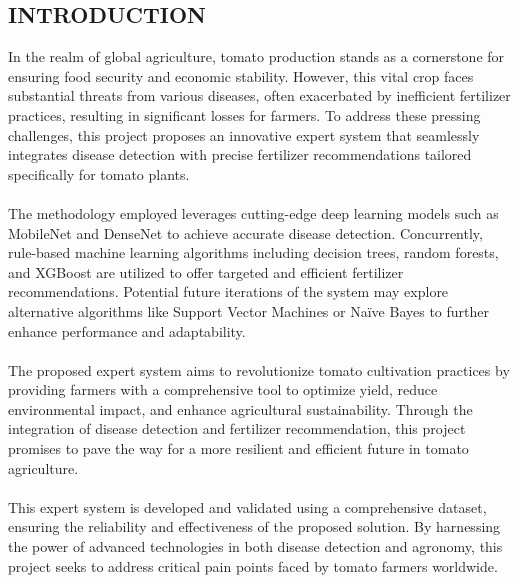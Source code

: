 \documentclass[12pt, English]{article}
\newcommand\tab[1][1cm]{\hspace*{#1}}
\begin{document}
\pagestyle{fancy}
\fancyfoot[R]{\footnotesize\thepage}
\begin{center}
\section{\Large INTRODUCTION}
\end{center}
\begin{normalsize}

\tab In the realm of global agriculture, tomato production stands as a cornerstone for ensuring food security and economic stability. However, this vital crop faces substantial threats from various diseases, often exacerbated by inefficient fertilizer practices, resulting in significant losses for farmers. To address these pressing challenges, this project proposes an innovative expert system that seamlessly integrates disease detection with precise fertilizer recommendations tailored specifically for tomato plants. 
\\\\
\tab  
The methodology employed leverages cutting-edge deep learning models such as MobileNet and DenseNet to achieve accurate disease detection. Concurrently, rule-based machine learning algorithms including decision trees, random forests, and XGBoost are utilized to offer targeted and efficient fertilizer recommendations. Potential future iterations of the system may explore alternative algorithms like Support Vector Machines or Naïve Bayes to further enhance performance and adaptability. 
\\\\
\tab  
The proposed expert system aims to revolutionize tomato cultivation practices by providing farmers with a comprehensive tool to optimize yield, reduce environmental impact, and enhance agricultural sustainability. Through the integration of disease detection and fertilizer recommendation, this project promises to pave the way for a more resilient and efficient future in tomato agriculture. 
\\\\
\tab  
This expert system is developed and validated using a comprehensive dataset, ensuring the reliability and effectiveness of the proposed solution. By harnessing the power of advanced technologies in both disease detection and agronomy, this project seeks to address critical pain points faced by tomato farmers worldwide. 

\end{normalsize}
\end{document}
